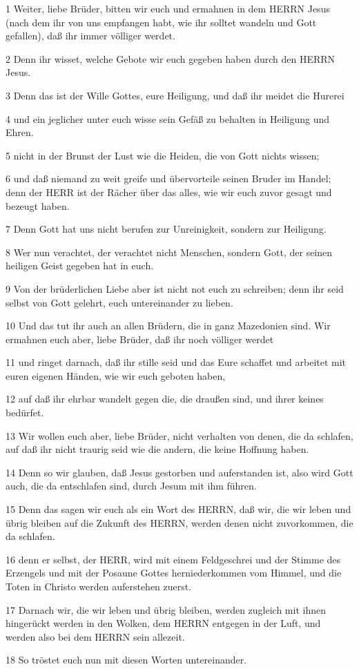 \par 1 Weiter, liebe Brüder, bitten wir euch und ermahnen in dem HERRN Jesus (nach dem ihr von uns empfangen habt, wie ihr solltet wandeln und Gott gefallen), daß ihr immer völliger werdet.
\par 2 Denn ihr wisset, welche Gebote wir euch gegeben haben durch den HERRN Jesus.
\par 3 Denn das ist der Wille Gottes, eure Heiligung, und daß ihr meidet die Hurerei
\par 4 und ein jeglicher unter euch wisse sein Gefäß zu behalten in Heiligung und Ehren.
\par 5 nicht in der Brunst der Lust wie die Heiden, die von Gott nichts wissen;
\par 6 und daß niemand zu weit greife und übervorteile seinen Bruder im Handel; denn der HERR ist der Rächer über das alles, wie wir euch zuvor gesagt und bezeugt haben.
\par 7 Denn Gott hat uns nicht berufen zur Unreinigkeit, sondern zur Heiligung.
\par 8 Wer nun verachtet, der verachtet nicht Menschen, sondern Gott, der seinen heiligen Geist gegeben hat in euch.
\par 9 Von der brüderlichen Liebe aber ist nicht not euch zu schreiben; denn ihr seid selbst von Gott gelehrt, euch untereinander zu lieben.
\par 10 Und das tut ihr auch an allen Brüdern, die in ganz Mazedonien sind. Wir ermahnen euch aber, liebe Brüder, daß ihr noch völliger werdet
\par 11 und ringet darnach, daß ihr stille seid und das Eure schaffet und arbeitet mit euren eigenen Händen, wie wir euch geboten haben,
\par 12 auf daß ihr ehrbar wandelt gegen die, die draußen sind, und ihrer keines bedürfet.
\par 13 Wir wollen euch aber, liebe Brüder, nicht verhalten von denen, die da schlafen, auf daß ihr nicht traurig seid wie die andern, die keine Hoffnung haben.
\par 14 Denn so wir glauben, daß Jesus gestorben und auferstanden ist, also wird Gott auch, die da entschlafen sind, durch Jesum mit ihm führen.
\par 15 Denn das sagen wir euch als ein Wort des HERRN, daß wir, die wir leben und übrig bleiben auf die Zukunft des HERRN, werden denen nicht zuvorkommen, die da schlafen.
\par 16 denn er selbst, der HERR, wird mit einem Feldgeschrei und der Stimme des Erzengels und mit der Posaune Gottes herniederkommen vom Himmel, und die Toten in Christo werden auferstehen zuerst.
\par 17 Darnach wir, die wir leben und übrig bleiben, werden zugleich mit ihnen hingerückt werden in den Wolken, dem HERRN entgegen in der Luft, und werden also bei dem HERRN sein allezeit.
\par 18 So tröstet euch nun mit diesen Worten untereinander.

